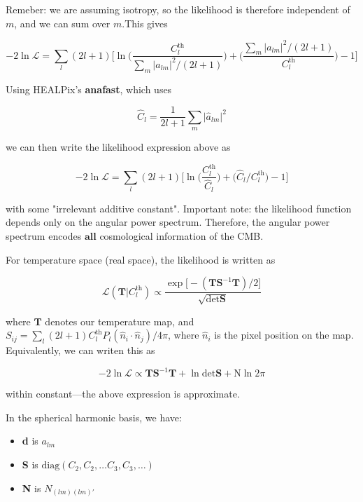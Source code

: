 \documentclass[a4paper, 11pt]{article}
\begin{document}
Remeber: we are assuming isotropy, so the likelihood is therefore independent of $m$, and we can sum over $m$.This gives 

\begin{equation}
-2\ln\mathcal{L} = \sum_{l}(2l+1)\Big[\ln\Big(\frac{C^{\text{th}}_l}{\sum_{m}\vert a_{lm}\vert^2/(2l+1)}\Big)+\Big(\frac{\sum_{m}\vert a_{lm}\vert^2/(2l+1)}{C^{\text{th}}_l}\Big)-1 \Big]
\end{equation}

Using HEALPix's \textbf{anafast}, which uses 

\begin{equation}
\hat{C}_l=\frac{1}{2l+1}\sum_m \vert\hat{a}_{lm}\vert^2
\end{equation}

we can then write the likelihood expression above as 

\begin{equation}
-2\ln\mathcal{L} = \sum_{l}(2l+1)\Big[\ln\Big( \frac{C^{\text{th}}_l}{\hat{C}_l}\Big) +\Big(\hat{C}_l/C^{\text{th}}_l\Big)-1 \Big]
\end{equation}

with some "irrelevant additive constant". Important note: the likelihood function depends only on the angular power spectrum. Therefore, the angular power spectrum encodes $\textbf{all}$ cosmological information of the CMB.

For temperature space (real space), the likelihood is written as 

\begin{equation}
\mathcal{L}(\textbf{T}\vert C^{\text{th}}_l)\propto \frac{\exp\big[-(\textbf{T}\textbf{S}^{-1}\textbf{T})/2\big]}{\sqrt{\text{det}\textbf{S}}}
\end{equation}

where $\textbf{T}$ denotes our temperature map, and $S_{ij}=\sum_l(2l+1)C^{\text{th}}_l P_l(\hat{n}_i\cdot\hat{n}_j)/4\pi$, where $\hat{n}_i$ is the pixel position on the map. Equivalently, we can writen this as

\begin{equation}
-2 \ln\mathcal{L}\propto\textbf{T}\textbf{S}^{-1}\textbf{T}+\ln\text{det}\textbf{S}+\text{N}\ln2\pi
\end{equation}

within constant---the above expression is approximate. 

In the spherical harmonic basis, we have: 
\begin{itemize}
\item[]\textbf{d} is $a_{lm}$
\item[]\textbf{S} is $\text{diag}(C_2, C_2,\dots C_3, C_3, \dots)$
\item[]\textbf{N} is $N_{(lm)(lm)'}$
\end{itemize}
\end{document}
